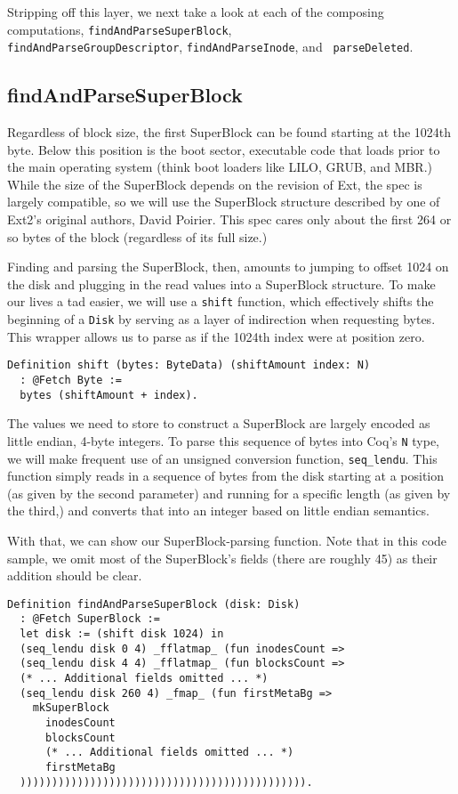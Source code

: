 \documentclass[nocopyrightspace]{sigplanconf}
\begin{document}
Stripping off this layer, we next take a look at each of the composing
computations, {\tt findAndParseSuperBlock}, \\
{\tt findAndParseGroupDescriptor}, {\tt findAndParseInode}, and {\tt
parseDeleted}.

\subsection{findAndParseSuperBlock}

Regardless of block size, the first SuperBlock can be found starting at the
1024th byte. Below this position is the boot sector, executable code that
loads prior to the main operating system (think boot loaders like LILO, GRUB,
and MBR.) While the size of the SuperBlock depends on the revision of Ext, the
spec is largely compatible, so we will use the SuperBlock structure described
by one of Ext2's original authors, David Poirier\cite{non-gnu}. This spec
cares only about the first 264 or so bytes of the block (regardless of its
full size.)

Finding and parsing the SuperBlock, then, amounts to jumping to offset 1024 on
the disk and plugging in the read values into a SuperBlock structure. To make
our lives a tad easier, we will use a {\tt shift} function, which effectively
shifts the beginning of a {\tt Disk} by serving as a layer of indirection when
requesting bytes. This wrapper allows us to parse as if the 1024th index were
at position zero.

\begin{lstlisting}
Definition shift (bytes: ByteData) (shiftAmount index: N)
  : @Fetch Byte :=
  bytes (shiftAmount + index).
\end{lstlisting}

The values we need to store to construct a SuperBlock are largely encoded as
little endian, 4-byte integers. To parse this sequence of bytes into Coq's
{\tt N} type, we will make frequent use of an unsigned conversion function,
{\tt seq\_lendu}. This function simply reads in a sequence of bytes from the
disk starting at a position (as given by the second parameter) and running for
a specific length (as given by the third,) and converts that into an integer
based on little endian semantics. 

With that, we can show our SuperBlock-parsing function. Note that in this code
sample, we omit most of the SuperBlock's fields (there are roughly 45) as
their addition should be clear.

\begin{lstlisting}
Definition findAndParseSuperBlock (disk: Disk)
  : @Fetch SuperBlock :=
  let disk := (shift disk 1024) in
  (seq_lendu disk 0 4) _fflatmap_ (fun inodesCount =>
  (seq_lendu disk 4 4) _fflatmap_ (fun blocksCount =>
  (* ... Additional fields omitted ... *)
  (seq_lendu disk 260 4) _fmap_ (fun firstMetaBg =>
    mkSuperBlock
      inodesCount
      blocksCount
      (* ... Additional fields omitted ... *)
      firstMetaBg
  ))))))))))))))))))))))))))))))))))))))))))))).
\end{lstlisting}
\end{document}
